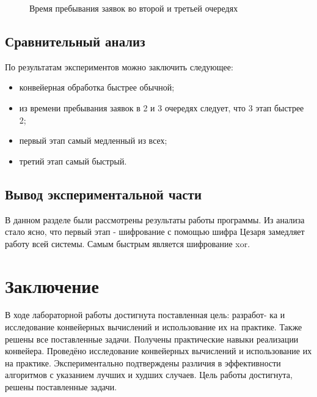 \begin{figure}[H]
    \caption{Время пребывания заявок во второй и третьей очередях}
    \label{ris:graph2}
\end{figure}

\section{Сравнительный анализ}\label{expE}

По результатам экспериментов можно заключить следующее:

\begin{itemize}
    \item конвейерная обработка быстрее обычной;
    \item из времени пребывания заявок в 2 и 3 очередях следует, что 3 этап быстрее 2;
    \item первый этап самый медленный из всех;
    \item третий этап самый быстрый.
\end{itemize}


\section{Вывод экспериментальной части}\label{experimentresult}

В данном разделе были рассмотрены результаты работы программы.
Из анализа стало ясно, что первый этап - шифрование с помощью шифра
Цезаря замедляет работу всей системы. Самым быстрым является шифрование xor.


\chapter*{Заключение}\label{exit}

В ходе лабораторной работы достигнута поставленная цель: разработ-
ка и исследование конвейерных вычислений и использование их на практике.
Также решены все поставленные задачи.
Получены практические навыки реализации конвейера. 
Проведёно исследование конвейерных вычислений и использование их на практике. 
Экспериментально подтверждены различия в эффективности алгоритмов с указанием лучших и худших случаев.
Цель работы достигнута, решены поставленные задачи. 
